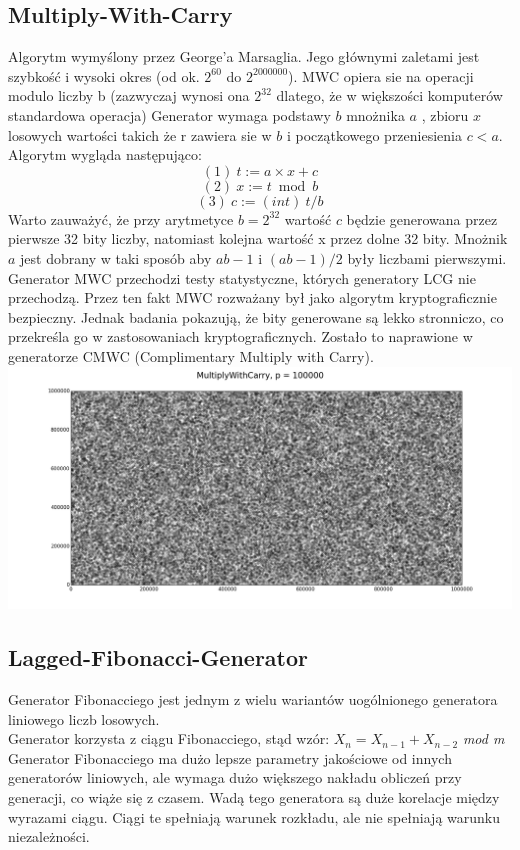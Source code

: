 \documentclass[a4paper, 11pt]{article} %
\begin{document}
\subsection{Multiply-With-Carry}
Algorytm wymyślony przez George'a Marsaglia. Jego głównymi zaletami jest szybkość i wysoki okres (od ok. $2^{60} $ do $2^{2000000}$).
MWC opiera sie na operacji modulo liczby b (zazwyczaj wynosi ona $2^{32}$ dlatego, że w większości komputerów standardowa operacja) 
Generator wymaga podstawy $b$ mnożnika $a$ , zbioru $x$ losowych wartości takich że r zawiera sie w $b$ i początkowego przeniesienia $c < a$. 
Algorytm wygląda następująco:
$$(1)\ t:=a \times x + c $$
$$(2)\ x:= t \bmod  b $$
$$(3)\ c:= (int)\ t/b$$
Warto zauważyć, że przy arytmetyce $b=2^{32}$ wartość $c$ będzie generowana przez pierwsze 32 bity liczby, natomiast kolejna wartość x przez dolne 32 bity. Mnożnik $a$ jest dobrany w taki sposób aby $ab-1$ i $(ab-1)/2$ były liczbami pierwszymi.
\newline Generator MWC przechodzi testy statystyczne, których generatory LCG nie przechodzą. Przez ten fakt MWC rozważany był jako algorytm kryptograficznie bezpieczny. Jednak badania pokazują, że bity generowane są lekko stronniczo, co przekreśla go w zastosowaniach kryptograficznych. Zostało to naprawione w generatorze CMWC (Complimentary Multiply with Carry).\\
\includegraphics[width=\linewidth]{img/mwc-1.png}

	
\subsection{Lagged-Fibonacci-Generator}
Generator Fibonacciego jest jednym z wielu wariantów uogólnionego generatora liniowego liczb losowych. \\
Generator korzysta z ciągu Fibonacciego, stąd wzór:
$X_{n}=X_{n-1}+X_{n-2}$ \textit{mod m}
Generator Fibonacciego ma dużo lepsze parametry jakościowe od innych generatorów liniowych, ale wymaga dużo większego nakładu obliczeń przy generacji, co wiąże się z czasem. Wadą tego generatora są duże korelacje między wyrazami ciągu. Ciągi te spełniają warunek rozkładu, ale nie spełniają warunku niezależności.
\end{document}

